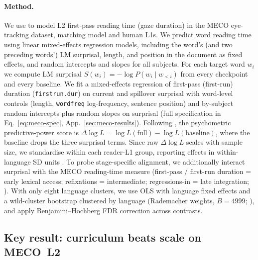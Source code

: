 \paragraph{Method.}  We use \beetle{} to model L2 first-pass reading time (gaze duration) in the MECO eye-tracking dataset\citep{siegelman2022expanding, kuperman2023text, siegelman2025wave, kuperman2025new}, matching model and human L1s. We predict word reading time using linear mixed-effects regression models, including the word's (and two preceding words') LM surprisal, length, and position in the document as fixed effects, and random intercepts and slopes for all subjects. For each target word $w_i$ we compute LM surprisal $S(w_i) = -\log P(w_i \mid w_{<i})$ from every \beetle{} checkpoint and every baseline. We fit a mixed-effects regression of first-pass (first-run) duration (\texttt{firstrun.dur}) on current and spillover surprisal with word-level controls (length, \texttt{wordfreq} log-frequency, sentence position) and by-subject random intercepts plus random slopes on surprisal (full specification in Eq.~\ref{eq:meco-spec}, App.~\ref{sec:meco-results}). Following \citet{wilcox-etal-2023-language}, the psychometric predictive-power score is $\Delta\log L = \log L(\mathrm{full}) - \log L(\mathrm{baseline})$, where the baseline drops the three surprisal terms. Since raw $\Delta\log L$ scales with sample size, we standardise within each reader-L1 group, reporting effects in within-language SD units \citep{de-varda-marelli-2022-effects}. To probe stage-specific alignment, we additionally interact surprisal with the MECO reading-time measure (first-pass / first-run duration = early lexical access; refixations = intermediate; regressions-in = late integration; \citealp{siegelman2025wave}). With only eight language clusters, we use OLS with language fixed effects and a wild-cluster bootstrap clustered by language (Rademacher weights, $B=4999$; \citealp{cameron2008bootstrap}), and apply Benjamini--Hochberg FDR correction across contrasts.

\subsection{Key result: curriculum beats scale on MECO~L2}\label{sec:reading-time-headline}




